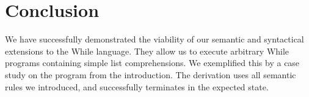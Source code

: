 \documentclass[12pt]{article}
\begin{document}
\section{Conclusion}

We have successfully demonstrated the viability of our semantic and syntactical extensions to the While language. They allow us to execute arbitrary While programs containing simple list comprehensions. We exemplified this by a case study on the program from the introduction. The derivation uses all semantic rules we introduced, and successfully terminates in the expected state.

\printbibliography
\end{document}
